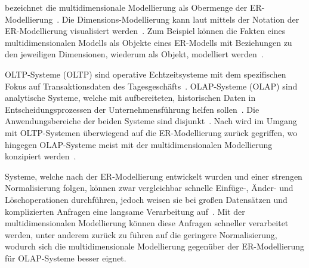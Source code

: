 \documentclass[
  language=german, %
  type=bachelor%
]{isthesis}
\begin{document}
\begin{content}
  \begin{figure}[caption={Beispiel eines \acrlong{ERM}}, label={beispiel-erm}]
  \end{figure}

  \textsc{\citeauthor{ballard1998data}} bezeichnet die multidimensionale Modellierung
  als Obermenge der ER-Modellierung~\cite[][S. 47]{ballard1998data}. Die
  Dimensions-Modellierung kann laut \textsc{\citeauthor{ballard1998data}}
  mittels der Notation der ER-Modellierung visualisiert werden~\cite[][S.
  47]{ballard1998data}. Zum Beispiel können die Fakten eines multidimensionalen Modells
  als Objekte eines ER-Modells mit Beziehungen zu den jeweiligen Dimensionen,
  wiederum als Objekt, modelliert werden~\cite[][S. 48]{ballard1998data}. 

  \acrlong{OLTP}-Systeme (OLTP) sind operative Echtzeitsysteme mit dem
  spezifischen Fokus auf Transaktionsdaten des Tagesgeschäfts~\cite[][S.
  11]{gabriel2009data}. \acrlong{OLAP}-Systeme (OLAP) sind analytische Systeme,
  welche mit aufbereiteten, historischen Daten in Entscheidungsprozessen der
  Unternehmensführung helfen sollen~\cite[][S. 1]{chaudhuri1997overview}. Die
  Anwendungsbereiche der beiden Systeme sind disjunkt~\cite[][S.
  334]{chamoni2000line}. Nach \textsc{\citeauthor{phipps2002automating}} wird
  im Umgang mit \acrshort{OLTP}-Systemen überwiegend auf die ER-Modellierung
  zurück gegriffen, wo hingegen \acrshort{OLAP}-Systeme meist mit der
  multidimensionalen Modellierung konzipiert werden~\cite[][S.
  2]{phipps2002automating}. 

  Systeme, welche nach der ER-Modellierung entwickelt wurden und einer strengen
  Normalisierung folgen, können zwar vergleichbar schnelle Einfüge-, Änder- und
  Löschoperationen durchführen, jedoch weisen sie bei großen Datensätzen und
  komplizierten Anfragen eine langsame Verarbeitung auf~\cite[][S.
  52]{ballard2012dimensional}. Mit der multidimensionalen Modellierung können diese
  Anfragen schneller verarbeitet werden\cite[][S.  52]{ballard2012dimensional},
  unter anderem zurück zu führen auf die geringere Normalisierung, wodurch
  sich die multidimensionale Modellierung gegenüber der ER-Modellierung für
  \acrshort{OLAP}-Systeme besser eignet.



\end{content}
\end{document}
